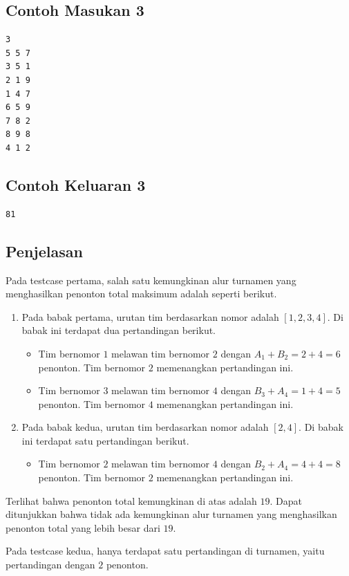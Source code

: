 \documentclass{article}
\begin{document}
\begin{multicols}{2}
\subsection*{Contoh Masukan 3}
\begin{lstlisting}
3
5 5 7
3 5 1
2 1 9
1 4 7
6 5 9
7 8 2
8 9 8
4 1 2
\end{lstlisting}
\null
\columnbreak

\subsection*{Contoh Keluaran 3}
\begin{lstlisting}
81
\end{lstlisting}
\vfill
\null
\end{multicols}

\subsection*{Penjelasan}
Pada testcase pertama, salah satu kemungkinan alur turnamen yang menghasilkan penonton total maksimum adalah seperti berikut.
\begin{enumerate}
    \item Pada babak pertama, urutan tim berdasarkan nomor adalah $[1,2,3,4]$. Di babak ini terdapat dua pertandingan berikut.
    \begin{itemize}
        \item Tim bernomor $1$ melawan tim bernomor $2$ dengan $A_1 + B_2 = 2 + 4 = 6$ penonton. Tim bernomor $2$ memenangkan pertandingan ini.
        \item Tim bernomor $3$ melawan tim bernomor $4$ dengan $B_3 + A_4 = 1 + 4 = 5$ penonton. Tim bernomor $4$ memenangkan pertandingan ini.
    \end{itemize}
    \item Pada babak kedua, urutan tim berdasarkan nomor adalah $[2,4]$. Di babak ini terdapat satu pertandingan berikut.
    \begin{itemize}
        \item Tim bernomor $2$ melawan tim bernomor $4$ dengan $B_2 + A_4 = 4 + 4 = 8$ penonton. Tim bernomor $2$ memenangkan pertandingan ini.
    \end{itemize}
\end{enumerate}
Terlihat bahwa penonton total kemungkinan di atas adalah $19$. Dapat ditunjukkan bahwa tidak ada kemungkinan alur turnamen yang menghasilkan penonton total yang lebih besar dari $19$.

Pada testcase kedua, hanya terdapat satu pertandingan di turnamen, yaitu pertandingan dengan $2$ penonton.
\end{document}
